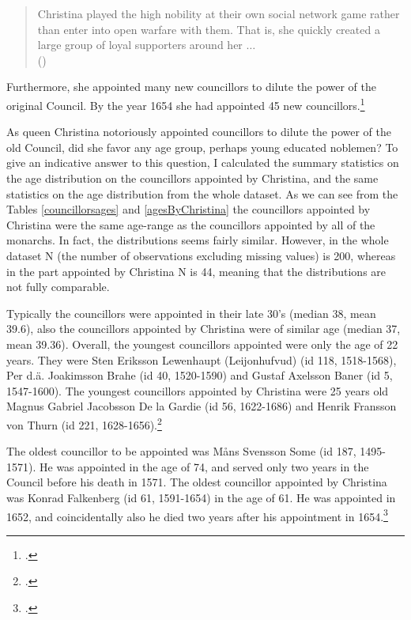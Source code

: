\begin{quote}
	Christina played the high nobility at their own social network game rather than enter into open warfare with them. That is, she quickly created a large group of loyal supporters around her $\dots$\\
	(\cite[p. 64]{HakanenAKoskinen2017})
\end{quote}

Furthermore, she appointed many new councillors to dilute the power of the original Council. By the year 1654 she had appointed 45 new councillors.\footcite[p. 64.]{HakanenAKoskinen2017}

As queen Christina notoriously appointed councillors to dilute the power of the old Council, did she favor any age group, perhaps young educated noblemen? To give an indicative answer to this question, I calculated the summary statistics on the age distribution on the councillors appointed by Christina, and the same statistics on the age distribution from the whole dataset. As we can see from the Tables \ref{councillorsages} and \ref{agesByChristina} the councillors appointed by Christina were the same age-range as the councillors appointed by all of the monarchs. In fact, the distributions seems fairly similar. However, in the whole dataset N (the number of observations excluding missing values) is 200, whereas in the part appointed by Christina N is 44, meaning that the distributions are not fully comparable.

Typically the councillors were appointed in their late 30's (median 38, mean 39.6), also the councillors appointed by Christina were of similar age (median 37, mean 39.36). Overall, the youngest councillors appointed were only the age of 22 years. They were Sten Eriksson Lewenhaupt (Leijonhufvud) (id 118, 1518-1568), Per d.ä. Joakimsson Brahe (id 40, 1520-1590) and Gustaf Axelsson Baner (id 5, 1547-1600). The youngest councillors appointed by Christina were 25 years old Magnus Gabriel Jacobsson De la Gardie (id 56, 1622-1686) and Henrik Fransson von Thurn (id 221, 1628-1656).\footcite{councillorsDS}

The oldest councillor to be appointed was Måns Svensson Some (id 187, 1495-1571). He was appointed in the age of 74, and served only two years in the Council before his death in 1571. The oldest councillor appointed by Christina was Konrad Falkenberg (id 61, 1591-1654) in the age of 61. He was appointed in 1652, and coincidentally also he died two years after his appointment in 1654.\footcite{councillorsDS} 

